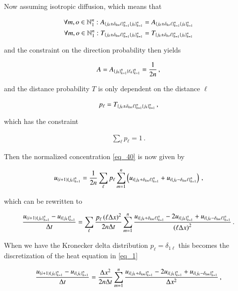 \documentclass[11pt,english,a4paper]{article}
\begin{document}
\begin{flushleft}
Now assuming isotropic diffusion, which means that

\begin{align*}
\forall m,o\in \mathbb{N}_1^n : A_{\left\lbrace{j_k\pm\delta_{km} \ell}\right\rbrace_{k=1}^n\left\lbrace{j_k}\right\rbrace_{k=1}^n} &= A_{\left\lbrace{j_k\pm\delta_{ko} \ell}\right\rbrace_{k=1}^n\left\lbrace{j_k}\right\rbrace_{k=1}^n} \\
\forall m,o\in \mathbb{N}_1^n : T_{\left\lbrace{j_k\pm\delta_{km} \ell}\right\rbrace_{k=1}^n\left\lbrace{j_k}\right\rbrace_{k=1}^n} &= T_{\left\lbrace{j_k\pm\delta_{ko} \ell}\right\rbrace_{k=1}^n\left\lbrace{j_k}\right\rbrace_{k=1}^n}
\end{align*}

and the constraint on the direction probability then yields

\begin{align}
A = A_{\left\lbrace{j_k}\right\rbrace_{k=1}^n\left\lbrace{\ell_k}\right\rbrace_{k=1}^n} = \frac{1}{2n}\,,
\label{eq_43}
\end{align}

and the distance probability $T$ is only dependent on the distance $\ell$

\begin{align*}
p_\ell = T_{\left\lbrace{j_k\pm\delta_{km} \ell}\right\rbrace_{k=1}^n\left\lbrace{j_k}\right\rbrace_{k=1}^n}\,,
\end{align*}

which has the constraint

\begin{align*}
\sum_{\ell} p_\ell = 1\,.
\end{align*}

Then the normalized concentration \eqref{eq_40} is now given by

\begin{align*}
u_{(i+1)\left\lbrace{j_k}\right\rbrace_{k=1}^n} = \frac{1}{2n}\sum_\ell p_\ell\sum_{m=1}^n \left({u_{i\left\lbrace{j_k+\delta_{km}\ell}\right\rbrace_{k=1}^n} + u_{i\left\lbrace{j_k-\delta_{km}\ell}\right\rbrace_{k=1}^n}}\right) \,,
\end{align*}

which can be rewritten to

\begin{align}
\frac{u_{(i+1)\left\lbrace{j_k}\right\rbrace_{k=1}^n}-u_{i\left\lbrace{j_k}\right\rbrace_{k=1}^n}}{\Delta t} = \sum_{\ell}\frac{p_\ell \left({\ell \Delta x}\right)^2}{2n\Delta t}\sum_{m=1}^n\frac{u_{i\left\lbrace{j_k+\delta_{km}\ell}\right\rbrace_{k=1}^n} - 2 u_{i\left\lbrace{j_k}\right\rbrace_{k=1}^n} + u_{i\left\lbrace{j_k-\delta_{km}\ell}\right\rbrace_{k=1}^n}}{\left({\ell\Delta x}\right)^2} \,.
\label{eq_44}
\end{align}

When we have the Kronecker delta distribution $p_\ell = \delta_{1\ell}$ this becomes the discretization of the heat equation in \eqref{eq_1} 

\begin{align*}
\frac{u_{(i+1)\left\lbrace{j_k}\right\rbrace_{k=1}^n}-u_{i\left\lbrace{j_k}\right\rbrace_{k=1}^n}}{\Delta t} = \frac{\Delta x^2}{2n\Delta t}\sum_{m=1}^n\frac{u_{i\left\lbrace{j_k+\delta_{km}}\right\rbrace_{k=1}^n} - 2 u_{i\left\lbrace{j_k}\right\rbrace_{k=1}^n} + u_{i\left\lbrace{j_k-\delta_{km}}\right\rbrace_{k=1}^n}}{\Delta x^2} \,,
\end{align*}


\end{flushleft}
\end{document}
